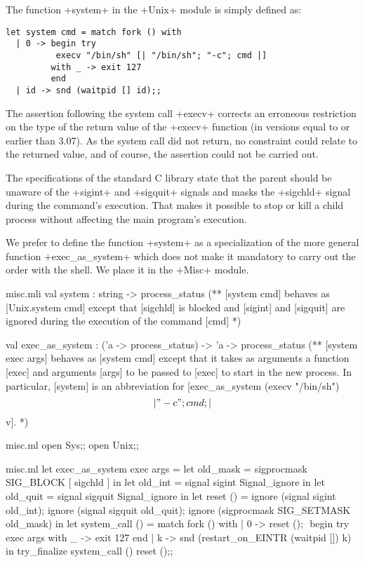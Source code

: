 \begin{example}
The function \ml+system+ in the \ml+Unix+ module is simply defined as: 

\begin{lstlisting}
let system cmd = match fork () with
  | 0 -> begin try
          execv "/bin/sh" [| "/bin/sh"; "-c"; cmd |]
         with _ -> exit 127 
         end
  | id -> snd (waitpid [] id);;
\end{lstlisting}

The assertion following the system call \ml+execv+ corrects an
erroneous restriction on the type of the return value of the
\ml+execv+ function (in versions equal to or earlier than 3.07).
As the system call did not return, no constraint could relate to the
returned value, and of course, the assertion could not be
carried out.

The specifications of the standard C library state that the parent
should be unaware of the \ml+sigint+ and \ml+sigquit+ signals and masks
the \ml+sigchld+ signal during the command's execution.  
That makes it possible to stop or kill a child process without
affecting the main program's execution.

We prefer to define the function \ml+system+ as a specialization of the
more general function \ml+exec_as_system+ which does not make it
mandatory to carry out the order with the shell. We place it in the
\ml+Misc+ module.

%
\begin{codefile}{misc.mli}
val system : string -> process_status
(** [system cmd] behaves as [Unix.system cmd] except that [sigchld] is
blocked and [sigint] and [sigquit] are ignored during the execution 
of the command [cmd] *)

val exec_as_system : ('a -> process_status) -> 'a -> process_status
(** [system exec args] behaves as [system cmd] except that it takes as
arguments a function [exec] and arguments [args] to be passed to [exec]
to start in the new process. In particular, [system] is an abbreviation for 
[exec_as_system (execv "/bin/sh") \[|"-c"; cmd; |\] v]. *)
\end{codefile}
%
\begin{codefile}{misc.ml}
open Sys;;
open Unix;;
\end{codefile}
%
\begin{listingcodefile}[style=numbers]{misc.ml}
let exec_as_system exec args = 
  let old_mask = sigprocmask SIG_BLOCK [ sigchld ] in 
  let old_int = signal sigint Signal_ignore in 
  let old_quit = signal sigquit Signal_ignore in 
  let reset () =
    ignore (signal sigint old_int); 
    ignore (signal sigquit old_quit);
    ignore (sigprocmask SIG_SETMASK old_mask) in
  let system_call () = 
    match fork () with
    | 0 -> 
        reset (); $\label{prog:sreset}$
        begin try 
          exec args 
        with _ -> exit 127 
        end
    | k -> 
        snd (restart_on_EINTR (waitpid []) k) in
  try_finalize system_call () reset ();; $\label{prog:stry}$


\end{listingcodefile}
\end{example}
